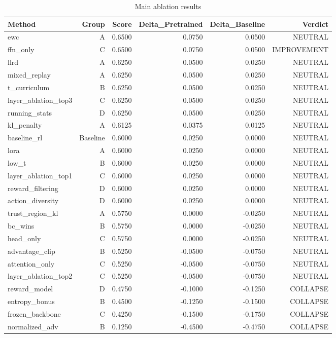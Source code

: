 \begin{table}[htbp]
\centering
\caption{Main ablation results}
\label{tab:main-results}
\begin{tabular}{lrrrrr}
\toprule
\textbf{Method} & \textbf{Group} & \textbf{Score} & \textbf{Delta\_Pretrained} & \textbf{Delta\_Baseline} & \textbf{Verdict} \\
\midrule
ewc & A & 0.6500 & 0.0750 & 0.0500 & NEUTRAL \\
ffn\_only & C & 0.6500 & 0.0750 & 0.0500 & IMPROVEMENT \\
llrd & A & 0.6250 & 0.0500 & 0.0250 & NEUTRAL \\
mixed\_replay & A & 0.6250 & 0.0500 & 0.0250 & NEUTRAL \\
t\_curriculum & B & 0.6250 & 0.0500 & 0.0250 & NEUTRAL \\
layer\_ablation\_top3 & C & 0.6250 & 0.0500 & 0.0250 & NEUTRAL \\
running\_stats & D & 0.6250 & 0.0500 & 0.0250 & NEUTRAL \\
kl\_penalty & A & 0.6125 & 0.0375 & 0.0125 & NEUTRAL \\
baseline\_rl & Baseline & 0.6000 & 0.0250 & 0.0000 & NEUTRAL \\
lora & A & 0.6000 & 0.0250 & 0.0000 & NEUTRAL \\
low\_t & B & 0.6000 & 0.0250 & 0.0000 & NEUTRAL \\
layer\_ablation\_top1 & C & 0.6000 & 0.0250 & 0.0000 & NEUTRAL \\
reward\_filtering & D & 0.6000 & 0.0250 & 0.0000 & NEUTRAL \\
action\_diversity & D & 0.6000 & 0.0250 & 0.0000 & NEUTRAL \\
trust\_region\_kl & A & 0.5750 & 0.0000 & -0.0250 & NEUTRAL \\
bc\_wins & B & 0.5750 & 0.0000 & -0.0250 & NEUTRAL \\
head\_only & C & 0.5750 & 0.0000 & -0.0250 & NEUTRAL \\
advantage\_clip & B & 0.5250 & -0.0500 & -0.0750 & NEUTRAL \\
attention\_only & C & 0.5250 & -0.0500 & -0.0750 & NEUTRAL \\
layer\_ablation\_top2 & C & 0.5250 & -0.0500 & -0.0750 & NEUTRAL \\
reward\_model & D & 0.4750 & -0.1000 & -0.1250 & COLLAPSE \\
entropy\_bonus & B & 0.4500 & -0.1250 & -0.1500 & COLLAPSE \\
frozen\_backbone & C & 0.4250 & -0.1500 & -0.1750 & COLLAPSE \\
normalized\_adv & B & 0.1250 & -0.4500 & -0.4750 & COLLAPSE \\
\bottomrule
\end{tabular}
\end{table}